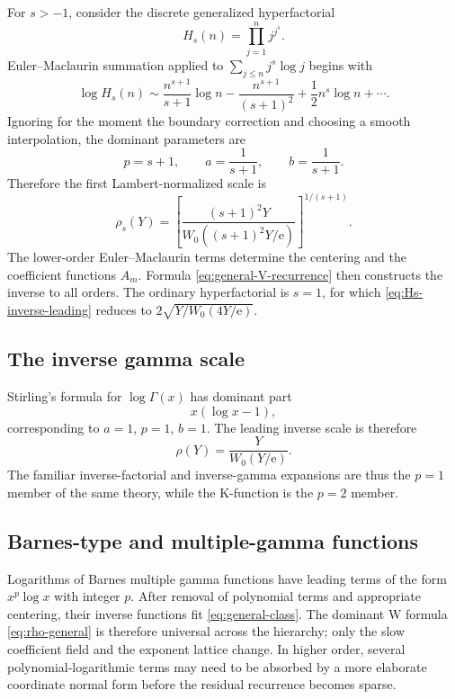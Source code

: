 \documentclass[11pt,a4paper]{article}
\numberwithin{equation}{section}
\theoremstyle{remark}
\newcommand{\e}{\mathrm e}
\begin{document}
For \(s>-1\), consider the discrete generalized hyperfactorial
\begin{equation}
H_s(n)=\prod_{j=1}^{n}j^{j^s}.
\label{eq:Hs}
\end{equation}
Euler--Maclaurin summation applied to
\(\sum_{j\le n}j^s\log j\) begins with
\begin{equation}
\log H_s(n)
\sim \frac{n^{s+1}}{s+1}\log n
-\frac{n^{s+1}}{(s+1)^2}
+\frac12n^s\log n+\cdots.
\label{eq:Hs-leading}
\end{equation}
Ignoring for the moment the boundary correction and choosing a smooth
interpolation, the dominant parameters are
\begin{equation}
p=s+1,
\qquad a=\frac1{s+1},
\qquad b=\frac1{s+1}.
\label{eq:Hs-parameters}
\end{equation}
Therefore the first Lambert-normalized scale is
\begin{equation}
\rho_s(Y)=
\left[
\frac{(s+1)^2Y}
{W_0((s+1)^2Y/\e)}
\right]^{1/(s+1)}.
\label{eq:Hs-inverse-leading}
\end{equation}
The lower-order Euler--Maclaurin terms determine the centering and the
coefficient functions \(A_m\).  Formula \cref{eq:general-V-recurrence} then
constructs the inverse to all orders.  The ordinary hyperfactorial is
\(s=1\), for which \cref{eq:Hs-inverse-leading} reduces to
\(2\sqrt{Y/W_0(4Y/\e)}\).

\subsection{The inverse gamma scale}

Stirling's formula for \(\log\Gamma(x)\) has dominant part
\[
x(\log x-1),
\]
corresponding to \(a=1\), \(p=1\), \(b=1\).  The leading inverse scale is
therefore
\begin{equation}
\rho(Y)=\frac{Y}{W_0(Y/\e)}.
\label{eq:inverse-gamma-leading}
\end{equation}
The familiar inverse-factorial and inverse-gamma expansions are thus the
\(p=1\) member of the same theory, while the K-function is the \(p=2\)
member.

\subsection{Barnes-type and multiple-gamma functions}

Logarithms of Barnes multiple gamma functions have leading terms of the form
\(x^p\log x\) with integer \(p\).  After removal of polynomial terms and
appropriate centering, their inverse functions fit
\cref{eq:general-class}.  The dominant W formula
\cref{eq:rho-general} is therefore universal across the hierarchy; only the
slow coefficient field and the exponent lattice change.  In higher order,
several polynomial-logarithmic terms may need to be absorbed by a more
elaborate coordinate normal form before the residual recurrence becomes
sparse.
\end{document}
